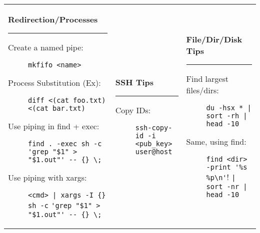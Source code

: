 \documentclass[landscape]{article}
\begin{document}
\begin{tabular*}{10.5in}{|p{2.9in}|p{2.9in}|p{2.9in}|}
    \begin{flushleft}
        \textbf{\large{Redirection}/Processes}
        \rule{2.9in}{.5pt}
        \small
        \begin{description}
            \item[Create a named pipe:]
                {\verb!mkfifo <name>!}
            \item[Process Substitution (Ex):]
                {\verb!diff <(cat foo.txt) <(cat bar.txt)!}
            \item[Use piping in find + exec:]
                {\verb!find . -exec sh -c!
                 \verb!'grep "$1" > "$1.out"' -- {} \;!}
            \item[Use piping with xargs:]
                {\verb!<cmd> | xargs -I {} sh -c!
                 \verb!'grep "$1" > "$1.out"' -- {} \;!}
        \end{description}
    \end{flushleft}
    &
    \begin{flushleft}
        \textbf{\large{}SSH Tips}
        \rule{2.9in}{.5pt}
        \small
        \begin{description}
            \item[Copy IDs:]
                {\verb!ssh-copy-id -i <pub_key> user@host!}
        \end{description}
    \end{flushleft}
    &
    \begin{flushleft}
        \textbf{\large{}File/Dir/Disk Tips}
        \rule{2.9in}{.5pt}
        \small
        \begin{description}
            \item[Find largest files/dirs:]
                {\verb!du -hsx * | sort -rh | head -10!}
            \item[Same, using find:]
                {\verb!find <dir> -print '%s %p\n'!
                 \verb!| sort -nr | head -10!}
        \end{description}
    \end{flushleft}
\end{tabular*}
\end{document}

